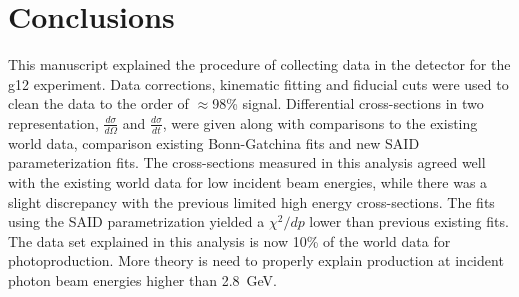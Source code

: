 \section{Conclusions}
This manuscript explained the procedure of collecting data in the  detector for the g12 experiment. Data corrections, kinematic fitting and fiducial cuts were used to clean the data to the order of $\approx$98\% signal. Differential cross-sections in two representation, $\frac{d\sigma}{d\Omega}$ and $\frac{d\sigma}{dt}$, were given along with comparisons to the existing world data, comparison existing Bonn-Gatchina fits and new SAID parameterization fits. The cross-sections measured in this analysis agreed well with the existing world data for low incident beam energies, while there was a slight discrepancy with the previous limited high energy cross-sections. The fits using the SAID parametrization yielded a $\chi^2/dp$ lower than previous existing fits. The data set explained in this analysis is now 10\% of the world data for \pizT photoproduction. More theory is need to properly explain \pizT production at incident photon beam energies higher than 2.8~GeV.





 